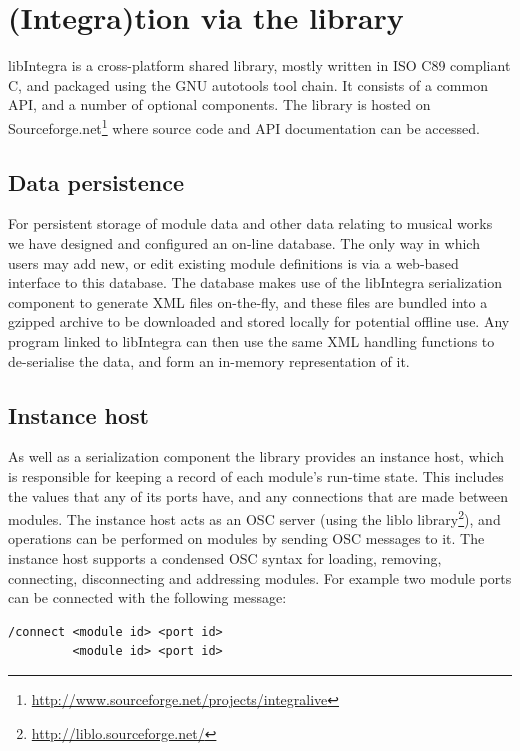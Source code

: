 \documentclass{article}
\begin{document}
\section{(Integra)tion via the library}\label{subsec:db_lib}

libIntegra is a cross-platform shared library, mostly written in ISO C89 compliant C, and packaged using the GNU autotools tool chain. It consists of a common API, and a number of optional components. The library is hosted on Sourceforge.net\footnote{\url{http://www.sourceforge.net/projects/integralive}} where source code and API documentation can be accessed.

\subsection{Data persistence}\label{subsec:serialization}

For persistent storage of module data and other data relating to musical works we have designed and configured an on-line database. The only way in which users may add new, or edit existing module definitions is via a web-based interface to this database. The database makes use of the libIntegra serialization component to generate XML files on-the-fly, and these files are bundled into a gzipped archive to be downloaded and stored locally for potential offline use. Any program linked to libIntegra can then use the same XML handling functions to de-serialise the data, and form an in-memory representation of it.

\subsection{Instance host}\label{subsec:instance_host}

As well as a serialization component the library provides an instance
host, which is responsible for keeping a record of each module's
run-time state. This includes the values that any of its ports have,
and any connections that are made between modules. The instance host
acts as an OSC server (using the liblo
library\footnote{\url{http://liblo.sourceforge.net/}}), and operations
can be performed on modules by sending OSC messages to it. The
instance host supports a condensed OSC syntax for loading, removing,
connecting, disconnecting and addressing modules. For example two
module ports can be connected with the following message: 
\begin{verbatim}
/connect <module id> <port id> 
         <module id> <port id>
\end{verbatim}
\end{document}
